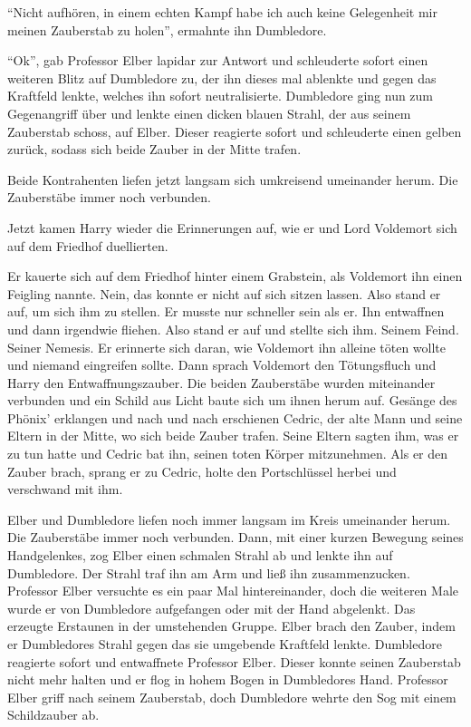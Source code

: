 \enquote{Nicht aufhören, in einem echten Kampf habe ich auch keine Gelegenheit mir meinen Zauberstab zu holen}, ermahnte ihn Dumbledore.

\enquote{Ok}, gab Professor Elber lapidar zur Antwort und schleuderte sofort einen weiteren Blitz auf Dumbledore zu, der ihn dieses mal ablenkte und gegen das Kraftfeld lenkte, welches ihn sofort neutralisierte. Dumbledore ging nun zum Gegenangriff über und lenkte einen dicken blauen Strahl, der aus seinem Zauberstab schoss, auf Elber. Dieser reagierte sofort und schleuderte einen gelben zurück, sodass sich beide Zauber in der Mitte trafen.

Beide Kontrahenten liefen jetzt langsam sich umkreisend umeinander herum. Die Zauberstäbe immer noch verbunden.

Jetzt kamen Harry wieder die Erinnerungen auf, wie er und Lord Voldemort sich auf dem Friedhof duellierten.

\begin{rueckblick}
Er kauerte sich auf dem Friedhof hinter einem Grabstein, als Voldemort ihn einen Feigling nannte. Nein, das konnte er nicht auf sich sitzen lassen. Also stand er auf, um sich ihm zu stellen. Er musste nur schneller sein als er. Ihn entwaffnen und dann irgendwie fliehen. Also stand er auf und stellte sich ihm. Seinem Feind. Seiner Nemesis. Er erinnerte sich daran, wie Voldemort ihn alleine töten wollte und niemand eingreifen sollte. Dann sprach Voldemort den Tötungsfluch und Harry den Entwaffnungszauber. Die beiden Zauberstäbe wurden miteinander verbunden und ein Schild aus Licht baute sich um ihnen herum auf. Gesänge des Phönix’ erklangen und nach und nach erschienen Cedric, der alte Mann und seine Eltern in der Mitte, wo sich beide Zauber trafen. Seine Eltern sagten ihm, was er zu tun hatte und Cedric bat ihn, seinen toten Körper mitzunehmen. Als er den Zauber brach, sprang er zu Cedric, holte den Portschlüssel herbei und verschwand mit ihm.
\end{rueckblick}

Elber und Dumbledore liefen noch immer langsam im Kreis umeinander herum. Die Zauberstäbe immer noch verbunden. Dann, mit einer kurzen Bewegung seines Handgelenkes, zog Elber einen schmalen Strahl ab und lenkte ihn auf Dumbledore. Der Strahl traf ihn am Arm und ließ ihn zusammenzucken. Professor Elber versuchte es ein paar Mal hintereinander, doch die weiteren Male wurde er von Dumbledore aufgefangen oder mit der Hand abgelenkt. Das erzeugte Erstaunen in der umstehenden Gruppe. Elber brach den Zauber, indem er Dumbledores Strahl gegen das sie umgebende Kraftfeld lenkte. Dumbledore reagierte sofort und entwaffnete Professor Elber. Dieser konnte seinen Zauberstab nicht mehr halten und er flog in hohem Bogen in Dumbledores Hand. Professor Elber griff nach seinem Zauberstab, doch Dumbledore wehrte den Sog mit einem Schildzauber ab.

